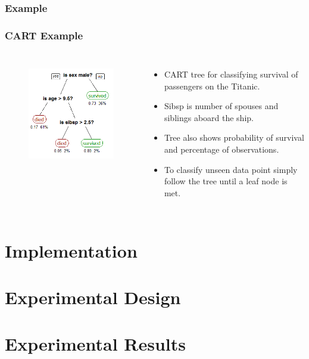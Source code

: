 \documentclass[mathserif]{beamer}
\begin{document}
	\subsubsection{Example}
	\begin{frame}
		\frametitle{CART Example}
		\begin{columns}[t]
			\begin{figure}
				\centering
				\includegraphics[keepaspectratio,scale=0.5]{CART.png} \\ \vspace{5px}
			\end{figure}
			
			\begin{itemize}
				\item CART tree for classifying survival of passengers on the Titanic.
				\item Sibsp is number of spouses and siblings aboard the ship.
				\item Tree also shows probability of survival and percentage of observations.
				\item To classify unseen data point simply follow the tree until a leaf node is met.
			\end{itemize}
		\end{columns}
	\end{frame}
	
	\section{Implementation}
	
	
	\section{Experimental Design}
	
	
	\section{Experimental Results}
	
	
\end{document}
